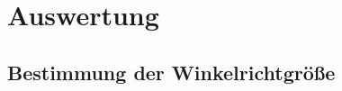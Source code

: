 \section{Auswertung}
\label{sec:Auswertung}

\subsection{Bestimmung der Winkelrichtgröße}
\label{subsec:a}

